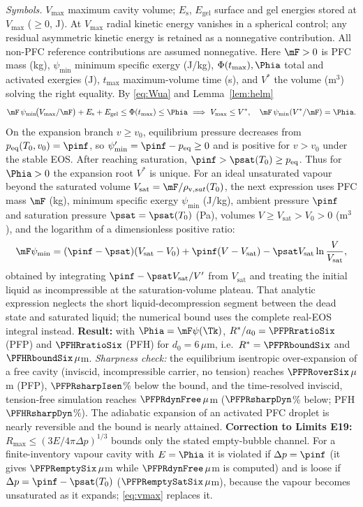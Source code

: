 \emph{Symbols.} $V_{\max}$ maximum cavity volume; $E_{\mathrm s}$, $E_{\mathrm{gel}}$ surface and gel energies
stored at $V_{\max}$ ($\ge0$, J). At $V_{\max}$ radial kinetic energy vanishes in a spherical
control; any residual asymmetric kinetic energy is retained as a nonnegative contribution.
All non-PFC reference contributions are assumed nonnegative. Here $\mF>0$ is PFC mass (kg),
$\psi_{\min}$ minimum specific exergy (J/kg), $\Phi(t_{\max}),\Phia$ total and activated exergies (J),
$t_{\max}$ maximum-volume time (s), and $V^*$ the volume (m$^3$) solving the right equality.
By \eqref{eq:Wua} and Lemma~\ref{lem:helm}
\begin{equation}
\mF\,\psi_{\min}\!\bigl(V_{\max}/\mF\bigr)+E_{\mathrm s}+E_{\mathrm{gel}}\le\Phi(t_{\max})\le\Phia
\ \Longrightarrow\ V_{\max}\le V^*,\quad \mF\,\psi_{\min}(V^*/\mF)=\Phia .\label{eq:vmax}
\end{equation}
On the expansion branch $v\ge v_0$, equilibrium pressure decreases from
$p_{\mathrm{eq}}(T_0,v_0)=\pinf$, so $\psi'_{\min}=\pinf-p_{\mathrm{eq}}\ge0$ and is positive
for $v>v_0$ under the stable EOS. After reaching saturation,
$\pinf>\psat(T_0)\ge p_{\mathrm{eq}}$. Thus for $\Phia>0$ the expansion root $V^*$ is unique.
For an ideal unsaturated vapour beyond the saturated volume $V_{\mathrm{sat}}=\mF/\rho_{\mathrm v,sat}(T_0)$,
the next expression uses PFC mass $\mF$ (kg), minimum specific exergy $\psi_{\min}$ (J/kg),
ambient pressure $\pinf$ and saturation pressure $\psat=\psat(T_0)$ (Pa), volumes
$V\ge V_{\mathrm{sat}}>V_0>0$ (m$^3$), and the logarithm of a dimensionless positive ratio:
\begin{equation}
\mF\psi_{\min}=(\pinf-\psat)(V_{\mathrm{sat}}-V_0)+\pinf(V-V_{\mathrm{sat}})-\psat V_{\mathrm{sat}}\ln\frac{V}{V_{\mathrm{sat}}},\label{eq:psimin_ideal}
\end{equation}
obtained by integrating $\pinf-\psat V_{\mathrm{sat}}/V'$ from $V_{\mathrm{sat}}$ and treating the
initial liquid as incompressible at the saturation-volume plateau. That analytic expression neglects
the short liquid-decompression segment between the dead state and saturated liquid;
the numerical bound uses the complete real-EOS integral instead.
\textbf{Result:} with $\Phia=\mF\psi(\Tk)$, $R^*/a_0=\PFPRratioSix$ (PFP) and $\PFHRratioSix$ (PFH) for
$d_0=6\,\mu$m, i.e.\ $R^*=\PFPRboundSix$ and $\PFHRboundSix\,\mu$m. \emph{Sharpness check:} the equilibrium
isentropic over-expansion of a free cavity (inviscid, incompressible carrier, no tension) reaches
$\PFPRoverSix\,\mu$m (PFP), $\PFPRsharpIsen$\% below the bound, and the time-resolved inviscid,
tension-free simulation reaches $\PFPRdynFree\,\mu$m ($\PFPRsharpDyn$\% below; PFH $\PFHRsharpDyn$\%). The adiabatic
expansion of an activated PFC droplet is nearly reversible and the bound is nearly attained.
\textbf{Correction to Limits E19:} $R_{\max}\le(3E/4\pi\Delta p)^{1/3}$ bounds only the stated empty-bubble channel.
For a finite-inventory vapour cavity with $E=\Phia$ it is violated if $\Delta p=\pinf$ (it gives
$\PFPRemptySix\,\mu$m while $\PFPRdynFree\,\mu$m is computed) and is loose if $\Delta p=\pinf-\psat(T_0)$
($\PFPRemptySatSix\,\mu$m), because the vapour becomes unsaturated as it expands; \eqref{eq:vmax} replaces it.

